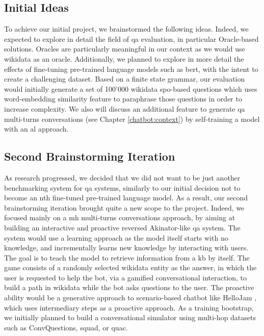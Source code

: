\subsection{Initial Ideas}
To achieve our initial project, we brainstormed the following ideas. Indeed, we expected to explore in detail the field of \gls{qa} evaluation, in particular Oracle-based solutions. Oracles are particularly meaningful in our context as we would use \gls{wikidata} as an oracle. Additionally, we planned to explore in more detail the effects of fine-tuning pre-trained language models such as \gls{bert}, with the intent to create a challenging dataset. Based on a finite state grammar, our evaluation would initially generate a set of 100'000 \gls{wikidata} \gls{spo}-based questions which uses word-embedding similarity feature to paraphrase those questions in order to increase complexity. We also will discuss an additional feature to generate \gls{qa} multi-turns conversations (see Chapter \ref{chatbot:context}) by self-training a model with an \gls{al} approach.


\subsection{Second Brainstorming Iteration}
As research progressed, we decided that we did not want to be just another benchmarking system for \gls{qa} systems, similarly to our initial decision not to become an nth fine-tuned pre-trained language model. As a result, our second brainstorming iteration brought quite a new scope to the project. Indeed, we focused mainly on a \gls{mh} multi-turns conversations approach, by aiming at building an interactive and proactive reversed Akinator-like \autocite{website:akinator} \gls{qa} system. The system would use a  learning approach as the model itself starts with no knowledge, and incrementally learns new knowledge by interacting with users. The goal is to teach the model to retrieve information from a \gls{kb} by itself. The game consists of a randomly selected \gls{wikidata} entity as the answer, in which the user is requested to help the bot, via a gamified conversational interaction, to build a path in \gls{wikidata} while the bot asks questions to the user. The proactive ability would be a generative approach to scenario-based chatbot like HelloJam \autocite{website:hellojam}, which uses intermediary steps as a proactive approach. As a training bootstrap, we initially planned to build a conversational simulator using multi-hop datasets such as ConvQuestions, \gls{squad}, or \gls{quac}.


